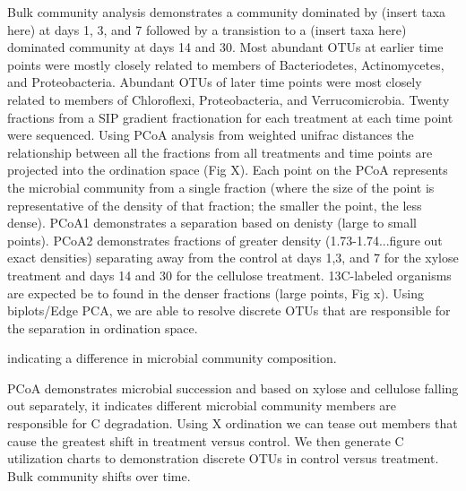 Bulk community analysis demonstrates a community dominated by (insert taxa here) at days 1, 3, and 7 followed by a transistion to a (insert taxa here) dominated community at days 14 and 30. Most abundant OTUs at earlier time points were mostly closely related to members of Bacteriodetes, Actinomycetes, and Proteobacteria.  Abundant OTUs of later time points were most closely related to members of Chloroflexi, Proteobacteria, and Verrucomicrobia.  Twenty fractions from a SIP gradient fractionation for each treatment at each time point were sequenced.  Using PCoA analysis from weighted unifrac distances the relationship between all the fractions from all treatments and time points are projected into the ordination space (Fig X).  Each point on the PCoA represents the microbial community from a single fraction (where the size of the point is representative of the density of that fraction; the smaller the point, the less dense). PCoA1 demonstrates a separation based on denisty (large to small points).  PCoA2 demonstrates fractions of greater density (1.73-1.74...figure out exact densities) separating away from the control at days 1,3, and 7 for the xylose treatment and days 14 and 30 for the cellulose treatment.  13C-labeled organisms are expected be to found in the denser fractions (large points, Fig x).  Using biplots/Edge PCA, we are able to resolve discrete OTUs that are responsible for the separation in ordination space.  
  
  indicating a difference in microbial community composition. 
         

PCoA demonstrates microbial succession and based on xylose and cellulose falling out separately, it indicates different microbial community members are responsible for C degradation.  Using X ordination we can tease out members that cause the greatest shift in treatment versus control.  We then generate C utilization charts to demonstration discrete OTUs in control versus treatment.  Bulk community shifts over time.  